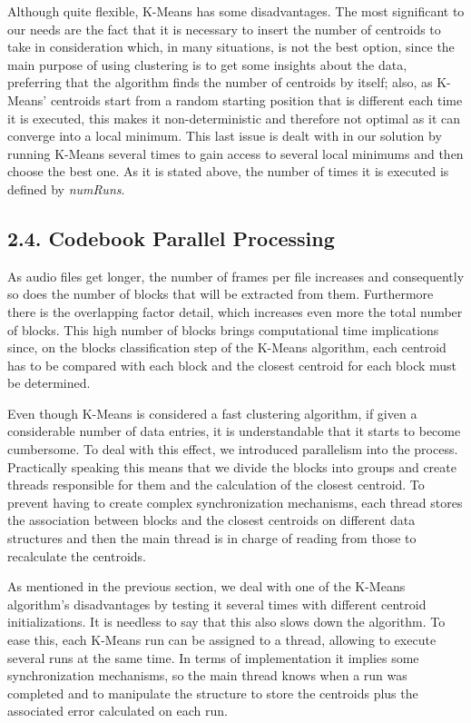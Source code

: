 \documentclass[12pt]{article}
\begin{document}
Although quite flexible, K-Means has some disadvantages.
The most significant to our needs are the fact that it is necessary to insert the 
number of centroids to take in consideration which, in many situations, is not 
the best option, since the main purpose of using clustering is to get some 
insights about the data, preferring that the algorithm finds the number of 
centroids by itself; also, as K-Means' centroids start from a random starting 
position that is different each time it is executed, this makes it non-deterministic
and therefore not optimal as it can converge into a local minimum.
This last issue is dealt with in our solution by running K-Means several times to 
gain access to several local minimums and then choose the best one. 
As it is stated above, the number of times it is executed is defined by {\it numRuns\/}.

\newpage
\subsection*{2.4. Codebook Parallel Processing}

As audio files get longer, the number of frames per file increases and 
consequently so does the number of blocks that will be extracted from them.
Furthermore there is the overlapping factor detail, which increases even more 
the total number of blocks.
This high number of blocks brings computational time implications since, on the 
blocks classification step of the K-Means algorithm, each centroid has to be 
compared with each block and the closest centroid for each block must be determined.

Even though K-Means is considered a fast clustering algorithm, if given a 
considerable number of data entries, it is understandable that it starts to 
become cumbersome. 
To deal with this effect, we introduced parallelism into the process.
Practically speaking this means that we divide the blocks into groups and create
threads responsible for them and the calculation of the closest centroid.
To prevent having to create complex synchronization mechanisms, each thread 
stores the association between blocks and the closest centroids on different 
data structures and then the main thread is in charge of reading from those to 
recalculate the centroids.

As mentioned in the previous section, we deal with one of the K-Means algorithm's
disadvantages by testing it several times with different centroid initializations.
It is needless to say that this also slows down the algorithm.
To ease this, each K-Means run can be assigned to a thread, allowing to execute 
several runs at the same time.
In terms of implementation it implies some synchronization mechanisms, so the 
main thread knows when a run was completed and to manipulate the structure to 
store the centroids plus the associated error calculated on each run.
\end{document}
